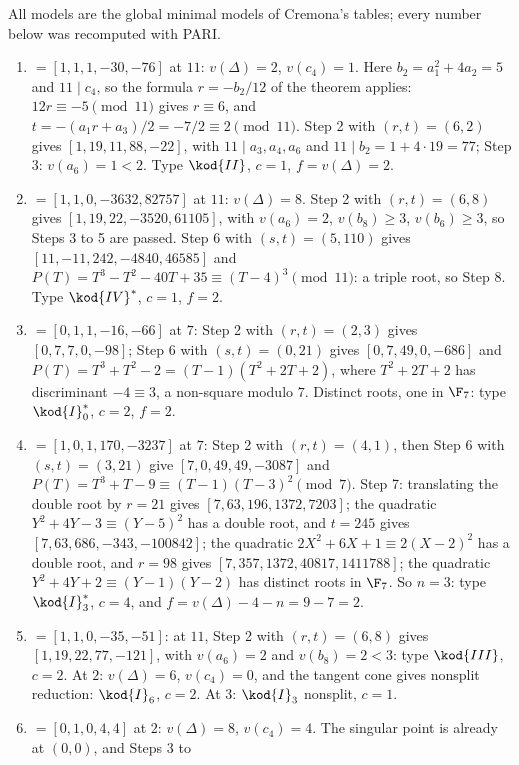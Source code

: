 \begin{example}\label{ex:reduction:tate-running}
All models are the global minimal models of Cremona's tables; every number below was recomputed with PARI.
\begin{enumerate}[label=(\alph*)]
\item {} $=[1,1,1,-30,-76]$ at $11$: $v(\Delta)=2$, $v(c_4)=1$. Here $b_2=a_1^2+4a_2=5$ and $11\mid c_4$, so the
formula $r=-b_2/12$ of the theorem applies: $12r\equiv-5\pmod{11}$ gives $r\equiv6$, and $t=-(a_1r+a_3)/2=-7/2\equiv2\pmod{11}$. Step 2 with
$(r,t)=(6,2)$ gives $[1,19,11,88,-22]$, with $11\mid a_3,a_4,a_6$ and $11\mid b_2=1+4\cdot19=77$; Step 3: $v(a_6)=1<2$. Type $\kod{II}$, $c=1$,
$f=v(\Delta)=2$.
\item {} $=[1,1,0,-3632,82757]$ at $11$: $v(\Delta)=8$. Step 2 with $(r,t)=(6,8)$ gives
$[1,19,22,-3520,61105]$, with $v(a_6)=2$, $v(b_8)\ge3$, $v(b_6)\ge3$, so Steps 3 to 5 are passed. Step 6 with
$(s,t)=(5,110)$ gives $[11,-11,242,-4840,46585]$ and $P(T)=T^3-T^2-40T+35\equiv(T-4)^3\pmod{11}$: a triple root, so
Step 8. Type $\kod{IV}^*$, $c=1$, $f=2$.
\item {} $=[0,1,1,-16,-66]$ at $7$: Step 2 with $(r,t)=(2,3)$ gives $[0,7,7,0,-98]$; Step 6 with $(s,t)=(0,21)$
gives $[0,7,49,0,-686]$ and $P(T)=T^3+T^2-2=(T-1)(T^2+2T+2)$, where $T^2+2T+2$ has discriminant $-4\equiv3$, a non-square
modulo $7$. Distinct roots, one in $\F_7$: type $\kod{I}_0^*$, $c=2$, $f=2$.
\item {} $=[1,0,1,170,-3237]$ at $7$: Step 2 with $(r,t)=(4,1)$, then Step 6 with $(s,t)=(3,21)$ give
$[7,0,49,49,-3087]$ and $P(T)=T^3+T-9\equiv(T-1)(T-3)^2\pmod 7$. Step 7: translating the double root by $r=21$ gives
$[7,63,196,1372,7203]$; the quadratic $Y^2+4Y-3\equiv(Y-5)^2$ has a double root, and $t=245$ gives
$[7,63,686,-343,-100842]$; the quadratic $2X^2+6X+1\equiv2(X-2)^2$ has a double root, and $r=98$ gives
$[7,357,1372,40817,1411788]$; the quadratic $Y^2+4Y+2\equiv(Y-1)(Y-2)$ has distinct roots in $\F_7$. So $n=3$: type
$\kod{I}_3^*$, $c=4$, and $f=v(\Delta)-4-n=9-7=2$.
\item {} $=[1,1,0,-35,-51]$: at $11$, Step 2 with $(r,t)=(6,8)$ gives $[1,19,22,77,-121]$, with $v(a_6)=2$ and
$v(b_8)=2<3$: type $\kod{III}$, $c=2$. At $2$: $v(\Delta)=6$, $v(c_4)=0$, and the tangent cone gives nonsplit reduction:
$\kod{I}_6$, $c=2$. At $3$: $\kod{I}_3$ nonsplit, $c=1$.
\item {} $=[0,1,0,4,4]$ at $2$: $v(\Delta)=8$, $v(c_4)=4$. The singular point is already at $(0,0)$, and Steps 3 to

\end{enumerate}
\end{example}
